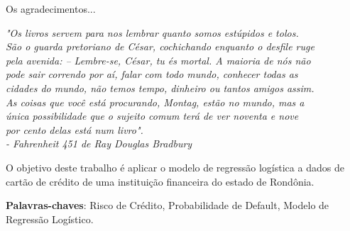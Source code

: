 \documentclass[
	12pt,				%
	openright,			%
	oneside,      %
	a4paper,			%
	english,			%
	french,				%
	spanish,			%
	brazil,				%
	]{abntex2}\usepackage[]{graphicx}\usepackage[]{xcolor}
\begin{document}

\frenchspacing


\imprimircapa

\imprimirfolhaderosto
\clearpage
\begin{agradecimentos} 
  Os agradecimentos... 
\end{agradecimentos}

\begin{epigrafe} 
  \vspace*{\fill} 
  \begin{flushright} 
  \textit{"Os livros servem para nos lembrar quanto somos estúpidos e tolos. 
      \\ São o guarda pretoriano de César, cochichando enquanto o desfile ruge 
      \\ pela avenida: – Lembre-se, César, tu és mortal. A maioria de nós não 
      \\ pode sair correndo por aí, falar com todo mundo, conhecer todas as 
      \\ cidades do mundo, não temos tempo, dinheiro ou tantos amigos assim. 
      \\ As coisas que você está procurando, Montag, estão no mundo, mas a 
      \\ única possibilidade que o sujeito comum terá de ver noventa e nove 
      \\ por cento delas está num livro". 
      \\ - Fahrenheit 451 de Ray Douglas Bradbury} 
  \end{flushright} 
\end{epigrafe}

\begin{resumo} 
  O objetivo deste trabalho é aplicar o modelo de regressão logística a dados
  de cartão de crédito de uma instituição financeira do estado de Rondônia.
  \vspace{\onelineskip} 
  \noindent
  
  \textbf{Palavras-chaves}: Risco de Crédito, Probabilidade de Default, Modelo de Regressão Logístico. 
\end{resumo}
\end{document}
